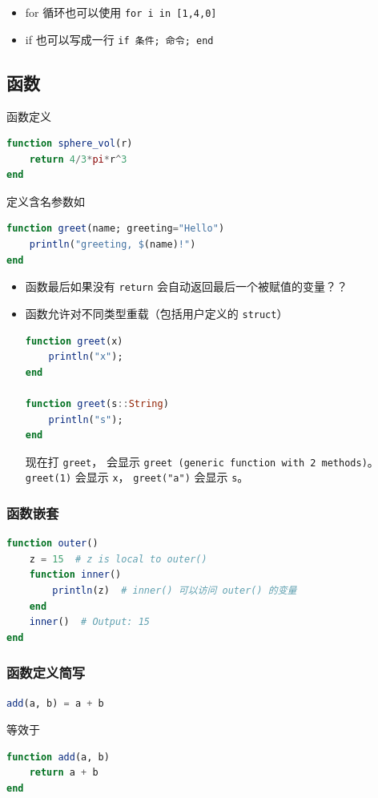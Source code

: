 \begin{itemize}
\item for 循环也可以使用 \verb`for i in [1,4,0]`
\item if 也可以写成一行 \verb`if 条件; 命令; end`
\end{itemize}

\subsection{函数}
函数定义
\begin{lstlisting}[language=julia]
function sphere_vol(r)
    return 4/3*pi*r^3
end
\end{lstlisting}

定义含名参数如
\begin{lstlisting}[language=julia]
function greet(name; greeting="Hello")
    println("greeting, $(name)!")
end
\end{lstlisting}

\begin{itemize}
\item 函数最后如果没有 \verb`return` 会自动返回最后一个被赋值的变量？？
\item 函数允许对不同类型重载（包括用户定义的 \verb`struct`）
\begin{lstlisting}[language=julia]
function greet(x)
    println("x");
end

function greet(s::String)
    println("s");
end
\end{lstlisting}
现在打 \verb`greet`， 会显示 \verb`greet (generic function with 2 methods)`。 \verb`greet(1)` 会显示 \verb`x`， \verb`greet("a")` 会显示 \verb`s`。
\end{itemize}

\subsubsection{函数嵌套}
\begin{lstlisting}[language=julia]
function outer()
    z = 15  # z is local to outer()
    function inner()
        println(z)  # inner() 可以访问 outer() 的变量
    end
    inner()  # Output: 15
end
\end{lstlisting}

\subsubsection{函数定义简写}
\begin{lstlisting}[language=julia]
add(a, b) = a + b
\end{lstlisting}
等效于
\begin{lstlisting}[language=julia]
function add(a, b)
    return a + b
end
\end{lstlisting}


